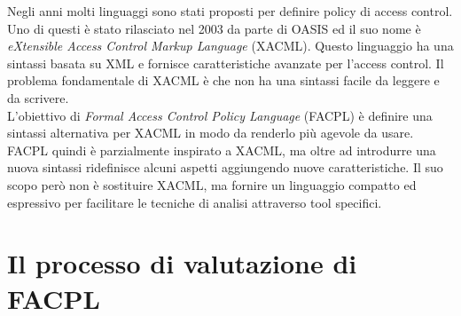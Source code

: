 Negli anni molti linguaggi sono stati proposti per definire policy di access control. Uno di questi è stato rilasciato nel 2003 da parte di OASIS ed il suo nome è \textit{eXtensible Access Control Markup Language} (XACML). Questo linguaggio ha una sintassi basata su XML e fornisce caratteristiche avanzate per l'access control. Il problema fondamentale di XACML è che non ha una sintassi facile da leggere e da scrivere. \\
L'obiettivo di \textit{Formal Access Control Policy Language} (FACPL) è definire una sintassi alternativa per XACML in modo da renderlo più agevole da usare.
FACPL quindi è parzialmente inspirato a XACML, ma oltre ad introdurre una nuova sintassi ridefinisce alcuni aspetti aggiungendo nuove caratteristiche. Il suo scopo però non è sostituire XACML, ma fornire un linguaggio compatto ed espressivo per facilitare le tecniche di analisi attraverso tool specifici.

\section{Il processo di valutazione di FACPL}
\label{sec:valutazione_facpl}


